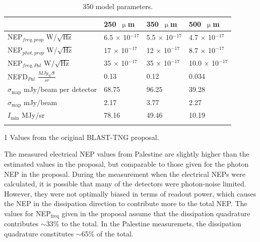 \begin{table}[!htbp]
  \begin{threeparttable}
\centering
\caption{350  model parameters.}
\label{table:NEP comparison}
\begin{tabular}{@{}llll@{}}
\dtoprule
 & 250~$\upmu$m & 350~$\upmu$m & 500~$\upmu$m \\ \midrule
NEP$_{freq,prop}$\tnote{1} W/$\sqrt{\mathrm{Hz}}$ & 6.5 $\times$ 10$^{-17}$ & 5.5 $\times$ 10$^{-17}$ & 4.7 $\times$ 10$^{-17}$ \\
NEP$_{phot,prop}$\tnote{2} W/$\sqrt{\mathrm{Hz}}$ & 17 $\times$ 10$^{-17}$ & 12 $\times$ 10$^{-17}$ & 8.7 $\times$ 10$^{-17}$ \\
NEP$_{freq,Pal}$ W/$\sqrt{\mathrm{Hz}}$ & 35 $\times$ 10$^{-17}$ & 35 $\times$ 10$^{-17}$ & 10.0 $\times$ 10$^{-17}$ \\
NEFD$_{Pal}$ $\frac{MJy\sqrt{s}}{sr}$ & 0.13 & 0.12 & 0.034 \\
$\sigma_{\mathrm{map}}$ mJy/beam per detector & 68.75 & 96.25 & 39.28 \\
$\sigma_{\mathrm{map}}$ mJy/beam & 2.17 & 3.77 & 2.27 \\
$I_{\mathrm{min}}$ MJy/sr & 78.16 & 49.46 & 10.19 \\ \dbottomrule
\\
\end{tabular}
\begin{tablenotes}
\item [1] Values from the original BLAST-TNG proposal.
\vspace{2mm}
\end{tablenotes}
\end{threeparttable}
\end{table}

The measured electrical NEP values from Palestine are slightly higher than the estimated values in the proposal, but comparable to those given for the photon NEP in the proposal. During the measurement when the electrical NEPs were calculated, it is possible that many of the detectors were photon-noise limited. However, they were not optimally biased in terms of readout power, which causes the NEP in the dissipation direction to contribute more to the total NEP. The values for NEP$_{\mathrm{freq}}$ given in the proposal assume that the dissipation quadrature contributes $\sim$33\% to the total. In the Palestine measuremets, the dissipation quadrature constitutes $\sim$65\% of the total.

